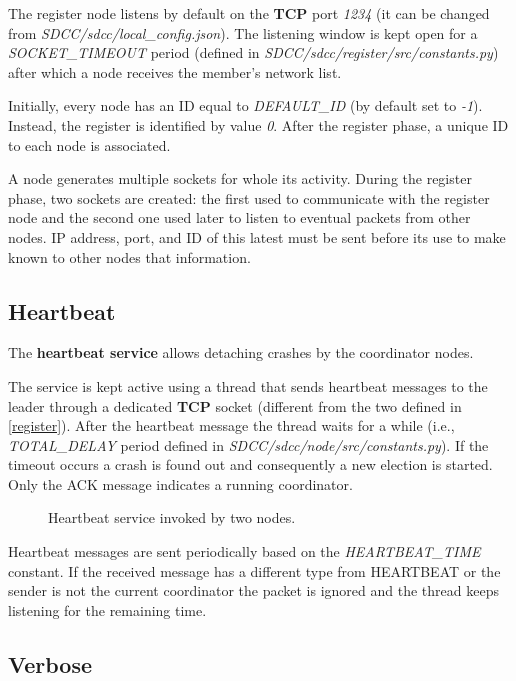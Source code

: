 \documentclass[conference]{IEEEtran}
\begin{document}
The register node listens by default on the \textbf{TCP} port \textit{1234} (it can be changed from \textit{SDCC/sdcc/local_config.json}). The listening window is kept open for a \textit{SOCKET\_TIMEOUT} period (defined in \textit{SDCC/sdcc/register/src/constants.py}) after which a node receives the member's network list. 

Initially, every node has an ID equal to \textit{DEFAULT\_ID} (by default set to \textit{-1}). Instead, the register is identified by value \textit{0}. After the register phase, a unique ID to each node is associated.

A node generates multiple sockets for whole its activity. During the register phase, two sockets are created: the first used to communicate with the register node and the second one used later to listen to eventual packets from other nodes. IP address, port, and ID of this latest must be sent before its use to make known to other nodes that information.

\subsection{Heartbeat}

The \textbf{heartbeat service} allows detaching crashes by the coordinator nodes. 

The service is kept active using a thread that sends heartbeat messages to the leader through a dedicated \textbf{TCP} socket (different from the two defined in \ref{register}). After the heartbeat message the thread waits for a while (i.e., \textit{TOTAL\_DELAY} period defined in \textit{SDCC/sdcc/node/src/constants.py}). If the timeout occurs a crash is found out and consequently a new election is started. Only the ACK message indicates a running coordinator.   

\begin{figure}[htbp]
  \centering
  
  \caption{Heartbeat service invoked by two nodes.}
\end{figure}
Heartbeat messages are sent periodically based on the \textit{HEARTBEAT\_TIME} constant. 
If the received message has a different type from HEARTBEAT or the sender is not the current coordinator the packet is ignored and the thread keeps listening for the remaining time. 

\subsection{Verbose}
\end{document}
